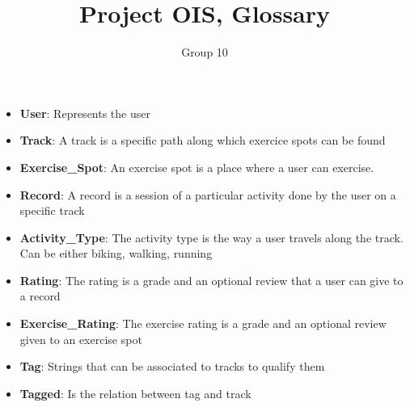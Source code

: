 \documentclass[11pt,a4paper]{article}
\author{Group 10}
\title{Project OIS, Glossary}
\date{}
\begin{document}
   \maketitle
   \begin{itemize}
      \item \textbf{User}: Represents the user
	
	\item \textbf{Track}:
   	A track is a specific path along which exercice spots can be found 
	\item\textbf{Exercise\_Spot}:
   	An exercise spot is a place where a user can exercise.
	\item\textbf{Record}:
   	A record is a session of a particular activity done by the user on a specific track
	\item \textbf{Activity\_Type}:
   	The activity type is the way a user travels along the track. Can be either biking, walking, running
   	\item \textbf{Rating}:
   	The rating is a grade and an optional review that a user can give to a record
   	\item \textbf{Exercise\_Rating}:
   	The exercise rating is a grade and an optional review given to an exercise spot
   	\item \textbf{Tag}:
	   Strings that can be associated to tracks to qualify them
	\item \textbf{Tagged}:
   	Is the relation between tag and track
   \end{itemize}

   
\end{document}
